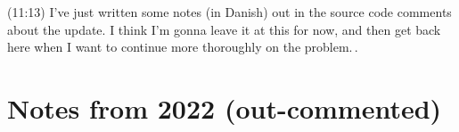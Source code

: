\documentclass{report}
\begin{document}

(11:13) I've just written some notes (in Danish) out in the source code comments about the update. I think I'm gonna leave it at this for now, and then get back here when I want to continue more thoroughly on the problem.\,.









\chapter{Notes from 2022 (out-commented)} \label{notes_from_2022}
\end{document}
